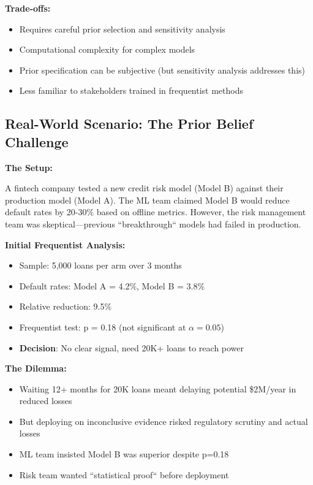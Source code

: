 \textbf{Trade-offs:}
\begin{itemize}
    \item Requires careful prior selection and sensitivity analysis
    \item Computational complexity for complex models
    \item Prior specification can be subjective (but sensitivity analysis addresses this)
    \item Less familiar to stakeholders trained in frequentist methods
\end{itemize}

\subsection{Real-World Scenario: The Prior Belief Challenge}

\textbf{The Setup:}

A fintech company tested a new credit risk model (Model B) against their production model (Model A). The ML team claimed Model B would reduce default rates by 20-30\% based on offline metrics. However, the risk management team was skeptical---previous ``breakthrough`` models had failed in production.

\textbf{Initial Frequentist Analysis:}
\begin{itemize}
    \item Sample: 5,000 loans per arm over 3 months
    \item Default rates: Model A = 4.2\%, Model B = 3.8\%
    \item Relative reduction: 9.5\%
    \item Frequentist test: p = 0.18 (not significant at $\alpha=0.05$)
    \item \textbf{Decision}: No clear signal, need 20K+ loans to reach power
\end{itemize}

\textbf{The Dilemma:}
\begin{itemize}
    \item Waiting 12+ months for 20K loans meant delaying potential \$2M/year in reduced losses
    \item But deploying on inconclusive evidence risked regulatory scrutiny and actual losses
    \item ML team insisted Model B was superior despite p=0.18
    \item Risk team wanted ``statistical proof`` before deployment
\end{itemize}


